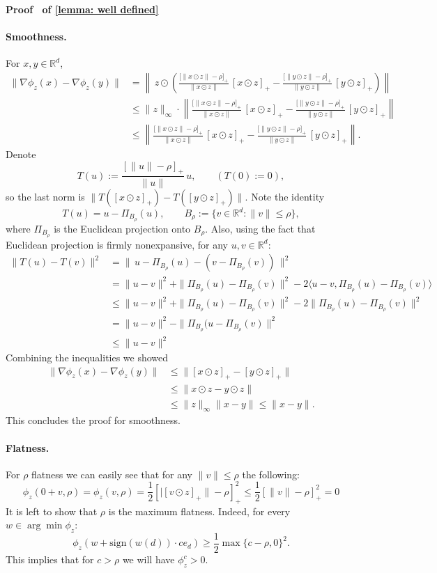 \documentclass[11pt]{article}
\renewenvironment{proof}[1][]{%
  \par\noindent\textbf{\upshape Proof%
  \if\relax\detokenize{#1}\relax\else\ #1\fi}\ %
}{\jmlrQED}
\begin{document}
\begin{proof}[of \cref{lemma: well defined}]
\paragraph{Smoothness.} For $x,y\in\mathbb{R}^d$,
\begin{align*}
    \|\nabla \phi_z(x)-\nabla \phi_z(y)\| & = \left\|\, z \odot \left(\frac{\big[\|x \odot z\|-\rho\big]_+}{\|x \odot z\|}\,[x \odot z]_+ - \frac{\big[\|y \odot z\|-\rho\big]_+}{\|y \odot z\|}\,[y \odot z]_+\right)\right\| \\
    & \leq\|z\|_{\infty} \cdot  \left\| \frac{\big[\|x \odot z\|-\rho\big]_+}{\|x \odot z\|}\,[x \odot z]_+ - \frac{\big[\|y \odot z\|-\rho\big]_+}{\|y \odot z\|}\,[y \odot z]_+ \right\|\\
    &  \leq \left\| \frac{\big[\|x \odot z\|-\rho\big]_+}{\|x \odot z\|}\,[x \odot z]_+ - \frac{\big[\|y \odot z\|-\rho\big]_+}{\|y \odot z\|}\,[y \odot z]_+ \right\|. \tag{$z\in[-1,1]^d$}
\end{align*}
Denote
\[
T(u):=\frac{[\|u\|-\rho]_+}{\|u\|}\,u,\qquad (T(0):=0),
\]
so the last norm is $\|T([x \odot z]_+)-T([y \odot z]_+)\|$.
Note the identity
$$
T(u)=u-\Pi_{B_\rho}(u),\qquad B_\rho:=\{v\in \mathbb{R}^d:\|v\|\le \rho\},
$$
where $\Pi_{B_\rho}$ is the Euclidean projection onto $B_\rho$. Also, using the fact that Euclidean projection is firmly nonexpansive, for any $u,v \in \mathbb{R}^d$:
\begin{align*}
 \|T(u)-T(v)\|^2 & = \|\,u-\Pi_{B_\rho}(u) - (v -\Pi_{B_\rho}(v))\,\|^2 \\
& = \|u - v\|^2 + \| \Pi_{B_\rho}(u) - \Pi_{B_\rho}(v)\|^2 - 2 \langle u-v , \Pi_{B_\rho}(u) - \Pi_{B_\rho}(v) \rangle \\
& \leq \|u-v\|^2 + \| \Pi_{B_\rho}(u) - \Pi_{B_\rho}(v)\|^2 - 2 \| \Pi_{B_\rho}(u) - \Pi_{B_\rho}(v)\|^2\\
& = \|u-v\|^2 - \| \Pi_{B_\rho}(u - \Pi_{B_\rho}(v)\|^2  \\
& \leq \|u-v \|^2 
\end{align*}
Combining the inequalities we showed
\begin{align*}
   \|\nabla \phi_z(x)-\nabla \phi_z(y)\|  & \leq \|[x \odot z]_+ - [y \odot z]_+\|\\
   & \leq \|x \odot z - y\odot z\| \tag{$[ \cdot]_+$ is 1-Lipschitz}\\
   & \leq \|z\|_{\infty} \|x-y\| \leq \|x-y\| \tag{$z\in [-1,1]^d$}. 
\end{align*}
This concludes the proof for smoothness. 

\paragraph{Flatness.} For $\rho$ flatness we can easily see that for any $\|v\|\leq \rho$ the following:
$$\phi_z(0+v, \rho) = \phi_z(v,\rho) = \frac{1}{2}\left[|[v \odot z]_+\| - \rho\right]_+^2 \leq \frac{1}{2} [\|v\| -\rho]_+^2 = 0$$
It is left to show that $\rho$ is the maximum flatness. Indeed, for every $w\in\arg\min \phi_z$: 
$$\phi_z(w + \text{sign}(w(d))\cdot ce_{d}) \geq \frac{1}{2}\max\{c - \rho, 0\}^2.$$
This implies that for $c > \rho$ we will have $\phi_z^{c} > 0$.
\end{proof}
\end{document}
